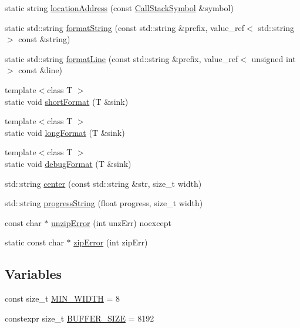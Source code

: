\begin{DoxyCompactItemize}
\item 
static string \hyperlink{namespacedg_1_1deepcore_ab17c2b708b02cfdd40dd378989b532be}{location\+Address} (const \hyperlink{structdg_1_1deepcore_1_1_call_stack_symbol}{Call\+Stack\+Symbol} \&symbol)
\item 
static std\+::string \hyperlink{namespacedg_1_1deepcore_a880c9dbe55359cc7d023f8a2f9334b86}{format\+String} (const std\+::string \&prefix, value\+\_\+ref$<$ std\+::string $>$ const \&string)
\item 
static std\+::string \hyperlink{namespacedg_1_1deepcore_aaff71593d4e9315f4d2c6e1a9e9e6520}{format\+Line} (const std\+::string \&prefix, value\+\_\+ref$<$ unsigned int $>$ const \&line)
\item 
{\footnotesize template$<$class T $>$ }\\static void \hyperlink{namespacedg_1_1deepcore_aa503c864d3f97367a02ad298fc7b12c1}{short\+Format} (T \&sink)
\item 
{\footnotesize template$<$class T $>$ }\\static void \hyperlink{namespacedg_1_1deepcore_ae1d1c308cbb675b2e40e3df2106918a2}{long\+Format} (T \&sink)
\item 
{\footnotesize template$<$class T $>$ }\\static void \hyperlink{namespacedg_1_1deepcore_a41e3b4691dcd1495707e68d2926b2d6a}{debug\+Format} (T \&sink)
\item 
std\+::string \hyperlink{namespacedg_1_1deepcore_a60a6e789dc5541737ef1429bc39d6635}{center} (const std\+::string \&str, size\+\_\+t width)
\item 
std\+::string \hyperlink{namespacedg_1_1deepcore_ad0ae2792453751f4ed8444126c673dc0}{progress\+String} (float progress, size\+\_\+t width)
\item 
const char $\ast$ \hyperlink{namespacedg_1_1deepcore_a0c24e3f3ec1175311028a99cc155f324}{unzip\+Error} (int unz\+Err) noexcept
\item 
static const char $\ast$ \hyperlink{namespacedg_1_1deepcore_afefe2123e053f6f50854805d088dd10a}{zip\+Error} (int zip\+Err)
\end{DoxyCompactItemize}
\subsection*{Variables}
\begin{DoxyCompactItemize}
\item 
const size\+\_\+t \hyperlink{namespacedg_1_1deepcore_a5280e55f2875dddfa4400c900d1cef04}{M\+I\+N\+\_\+\+W\+I\+D\+TH} = 8
\item 
constexpr size\+\_\+t \hyperlink{namespacedg_1_1deepcore_ab58b33a87a4d5099cdc3f464eff13f48}{B\+U\+F\+F\+E\+R\+\_\+\+S\+I\+ZE} = 8192
\end{DoxyCompactItemize}


